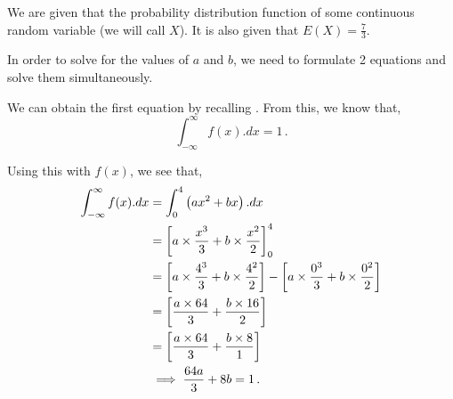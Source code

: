 %
%


\begin{subquestions}
	
\subquestion
We are given that the probability distribution function of some continuous random variable (we will call $X$). It is also given that $E(X) = \frac{7}{3}$. 
\begin{subsubquestions}
	
\subsubquestion
	
In order to solve for the values of $a$ and $b$, we need to formulate 2 equations and solve them simultaneously. 

We can obtain the first equation by recalling . From this, we know that,
\begin{equation}
	\int_{-\infty}^{\infty} f(x).dx = 1 \,.
\end{equation}	
	
Using this with $f(x)$, we see that,
\begin{align}
	\int_{-\infty}^{\infty} f(x).dx & = \int_{0}^{4} \left(ax^2 + bx \right).dx \nonumber \\
	                                & = \left[a \times \frac{x^3}{3} + b \times \frac{x^2}{2}\right]^{4}_{0} \nonumber \\
	                                & = \left[a \times \frac{4^3}{3} + b \times \frac{4^2}{2}\right] - \left[a \times \frac{0^3}{3} + b \times \frac{0^2}{2}\right] \nonumber \\
	                                & = \left[\frac{a \times 64}{3} + \frac{b \times 16}{2}\right] \nonumber \\
	                                & = \left[\frac{a \times 64}{3} + \frac{b \times 8}{1}\right] \nonumber \\
	                                & \implies \frac{64a}{3} + 8b = 1 \,. \label{2012:q3:CRV1}           
\end{align}


\end{subsubquestions}
\end{subquestions}
